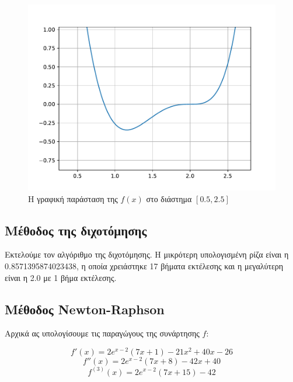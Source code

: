 \documentclass[a4paper,11pt]{article}
\newcommand{\lt}{\latintext}
\newcommand{\gt}{\greektext}
\begin{document}
\begin{figure}[h!]
\centering
    \includegraphics[width=0.8\linewidth]{images/ask1_2.pdf}
    \centering
    \caption{Η γραφική παράσταση της \lt \(f(x)\) \gt στο διάστημα \([0.5, 2.5]\)}
    \label{fig:1_2}
\end{figure}

\subsection{Μέθοδος της διχοτόμησης}



Εκτελούμε τον αλγόριθμο της διχοτόμησης. Η μικρότερη υπολογισμένη ρίζα είναι η 0.8571395874023438, η οποία χρειάστηκε 17 βήματα εκτέλεσης και η μεγαλύτερη είναι η 2.0 με 1 βήμα εκτέλεσης.


\subsection{Μέθοδος \lt Newton-Raphson}

\gt Αρχικά ας υπολογίσουμε τις παραγώγους της συνάρτησης $f$:

\begin{displaymath}
    f'(x) = 2e^{x-2}(7x+1)-21x^2+40x-26
\end{displaymath}
\begin{displaymath}
    f''(x) = 2e^{x-2}(7x+8)-42x+40
\end{displaymath}
\begin{displaymath}
    f^{(3)}(x) = 2e^{x-2}(7x+15)-42
\end{displaymath}
\end{document}
